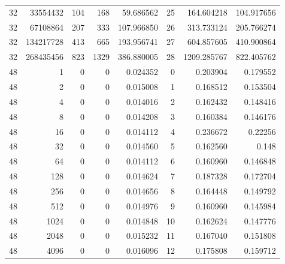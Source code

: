 \begin{longtable}[c]{@{}rrrrrrrr@{}}
    32        & 33554432  & 104       & 168      & 59.686562   & 25                  & 164.604218  & 104.917656 \\
    32        & 67108864  & 207       & 333      & 107.966850  & 26                  & 313.733124  & 205.766274 \\
    32        & 134217728 & 413       & 665      & 193.956741  & 27                  & 604.857605  & 410.900864 \\
    32        & 268435456 & 823       & 1329     & 386.880005  & 28                  & 1209.285767 & 822.405762 \\
    48        & 1         & 0         & 0        & 0.024352    & 0                   & 0.203904    & 0.179552   \\
    48        & 2         & 0         & 0        & 0.015008    & 1                   & 0.168512    & 0.153504   \\
    48        & 4         & 0         & 0        & 0.014016    & 2                   & 0.162432    & 0.148416   \\
    48        & 8         & 0         & 0        & 0.014208    & 3                   & 0.160384    & 0.146176   \\
    48        & 16        & 0         & 0        & 0.014112    & 4                   & 0.236672    & 0.22256    \\
    48        & 32        & 0         & 0        & 0.014560    & 5                   & 0.162560    & 0.148      \\
    48        & 64        & 0         & 0        & 0.014112    & 6                   & 0.160960    & 0.146848   \\
    48        & 128       & 0         & 0        & 0.014624    & 7                   & 0.187328    & 0.172704   \\
    48        & 256       & 0         & 0        & 0.014656    & 8                   & 0.164448    & 0.149792   \\
    48        & 512       & 0         & 0        & 0.014976    & 9                   & 0.160960    & 0.145984   \\
    48        & 1024      & 0         & 0        & 0.014848    & 10                  & 0.162624    & 0.147776   \\
    48        & 2048      & 0         & 0        & 0.015232    & 11                  & 0.167040    & 0.151808   \\
    48        & 4096      & 0         & 0        & 0.016096    & 12                  & 0.175808    & 0.159712   \\

\end{longtable}
